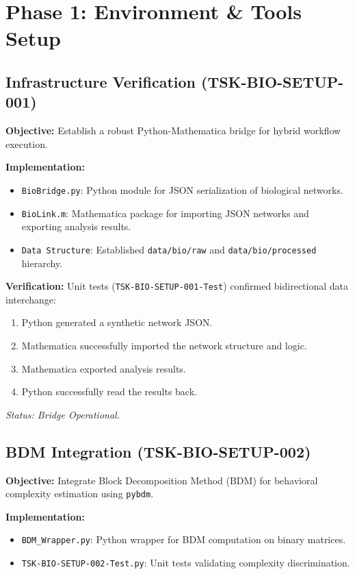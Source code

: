 \documentclass{article}
\begin{document}
\section{Phase 1: Environment \& Tools Setup}

\subsection{Infrastructure Verification (TSK-BIO-SETUP-001)}
\textbf{Objective:} Establish a robust Python-Mathematica bridge for hybrid workflow execution.

\textbf{Implementation:}
\begin{itemize}
    \item \texttt{BioBridge.py}: Python module for JSON serialization of biological networks.
    \item \texttt{BioLink.m}: Mathematica package for importing JSON networks and exporting analysis results.
    \item \texttt{Data Structure}: Established \texttt{data/bio/raw} and \texttt{data/bio/processed} hierarchy.
\end{itemize}

\textbf{Verification:}
Unit tests (\texttt{TSK-BIO-SETUP-001-Test}) confirmed bidirectional data interchange:
\begin{enumerate}
    \item Python generated a synthetic network JSON.
    \item Mathematica successfully imported the network structure and logic.
    \item Mathematica exported analysis results.
    \item Python successfully read the results back.
\end{enumerate}
\textit{Status: Bridge Operational.}

\subsection{BDM Integration (TSK-BIO-SETUP-002)}
\textbf{Objective:} Integrate Block Decomposition Method (BDM) for behavioral complexity estimation using \texttt{pybdm}.

\textbf{Implementation:}
\begin{itemize}
    \item \texttt{BDM\_Wrapper.py}: Python wrapper for BDM computation on binary matrices.
    \item \texttt{TSK-BIO-SETUP-002-Test.py}: Unit tests validating complexity discrimination.
\end{itemize}
\end{document}
